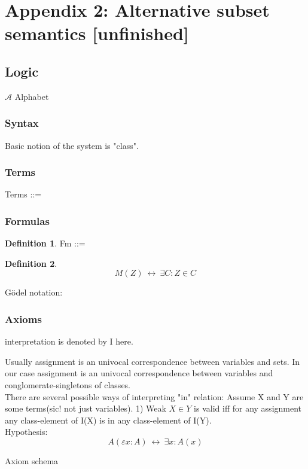 \documentclass[10pt,a4paper]{article}
\theoremstyle{definition}
\newtheorem{definition}{Definition}[section]
\renewcommand{\iff}{\ \longleftrightarrow\ }
\begin{document}
\section{Appendix 2: Alternative subset semantics [unfinished]}
\subsection{Logic}
$\mathcal{A}$ Alphabet
\subsubsection{Syntax}
Basic notion of the system is "class".
\subsubsection{Terms}
Terms ::= \\

\subsubsection{Formulas}
\begin{definition}
Fm ::=\\
\end{definition}

\begin{definition}
\[M(Z) \iff \exists C: Z\in C\]
\end{definition}

G\"odel notation:\\

\subsubsection{Axioms}
interpretation is denoted by I here.

Usually assignment is an univocal correspondence between variables and sets.
In our case assignment is an univocal correspondence between variables and conglomerate-singletons of classes.\\

There are several possible ways of interpreting "in" relation: 
Assume X and Y are some terms(sic! not just variables).
1) Weak
$X\in Y$ is valid iff for any assignment any class-element of I(X) is in any class-element of I(Y).\\

Hypothesis:
\[A(\varepsilon x: A)\iff \exists x: A(x)\]




Axiom schema
\end{document}
